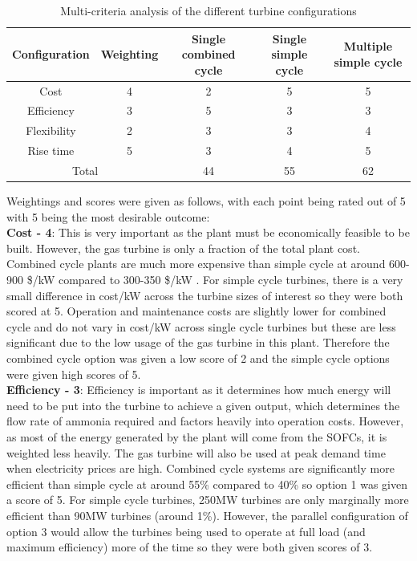\begin {table} [h]
\begin{center}
\caption{Multi-criteria analysis of the different turbine configurations} \label{tab:MCA} 
\begin{tabular}{ |c|c|c|c|c| }
 \hline
  Configuration & Weighting & Single combined cycle & Single simple cycle & Multiple simple cycle\\ 
 \hline
  Cost & 4 & 2 & 5 & 5 \\ 
 \hline
  Efficiency & 3 & 5 & 3 & 3\\ 
 \hline
  Flexibility & 2 & 3 & 3 & 4\\
 \hline
  Rise time & 5 & 3 & 4 & 5\\
   \hline
   \multicolumn{2}{|c|}{Total}  & 44 & 55 & 62 \\
 \hline
\end{tabular}
\end{center}  
\end {table}
Weightings and scores were given as follows, with each point being rated out of 5 with 5 being the most desirable outcome: 
\\\textbf{Cost - 4}: This is very important as the plant must be economically feasible to be built. However, the gas turbine is only a fraction of the total plant cost. Combined cycle plants are much more expensive than simple cycle at around 600-900 \$/kW compared to 300-350 \$/kW \cite{turbinecost}. For simple cycle turbines, there is a very small difference in cost/kW across the turbine sizes of interest so they were both scored at 5. Operation and maintenance costs are slightly lower for combined cycle and do not vary in cost/kW across single cycle turbines but these are less significant due to the low usage of the gas turbine in this plant. \cite{boyce} Therefore the combined cycle option was given a low score of 2 and the simple cycle options were given high scores of 5.
\\\textbf{Efficiency - 3}: Efficiency is important as it determines how much energy will need to be put into the turbine to achieve a given output, which determines the flow rate of ammonia required and factors heavily into operation costs. However, as most of the energy generated by the plant will come from the SOFCs, it is weighted less heavily. The gas turbine will also be used at peak demand time when electricity prices are high. Combined cycle systems are significantly more efficient than simple cycle at around 55\% compared to 40\% so option 1 was given a score of 5. For simple cycle turbines, 250MW turbines are only marginally more efficient than 90MW turbines (around 1\%). However, the parallel configuration of option 3 would allow the turbines being used to operate at full load (and maximum efficiency) more of the time so they were both given scores of 3. 
